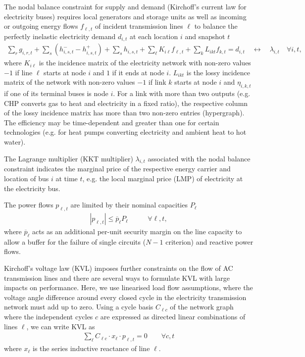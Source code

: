 The nodal balance constraint for supply and demand (Kirchoff's current law for electricity
buses) requires local generators and storage units as well as incoming or
outgoing energy flows $f_{\ell,t}$ of incident transmission lines $\ell$ to
balance the perfectly inelastic electricity demand $d_{i,t}$ at each location
$i$ and snapshot $t$
\begin{align}
    \sum_r g_{i,r,t} + \sum_s \left(h_{i,s,t}^- - h_{i,s,t}^+ \right) + \sum_s h_{i,s,t} + \sum_\ell K_{i\ell} f_{\ell,t} + \sum_k L_{ikt} f_{k,t} = d_{i,t}  \quad \leftrightarrow \quad \lambda_{i,t} \quad \forall i,t,
\end{align}
where $K_{i\ell}$ is the incidence matrix of the electricity network with
non-zero values $-1$ if line $\ell$ starts at node $i$ and $1$ if it ends at
node $i$. $L_{ikt}$ is the lossy incidence matrix of the network with
non-zero values $-1$ if link $k$ starts at node $i$ and $\eta_{i,k,t}$ if one of
its terminal buses is node $i$. For a link with more than two outputs (e.g. CHP
converts gas to heat and electricity in a fixed ratio), the respective column of
the lossy incidence matrix has more than two non-zero entries (hypergraph). The
efficiency may be time-dependent and greater than one for certain technologies
(e.g. for heat pumps converting electricity and ambient heat to hot water).

The Lagrange multiplier (KKT multiplier) $\lambda_{i,t}$ associated with the
nodal balance constraint indicates the marginal price of the respective energy
carrier and location of bus $i$ at time $t$, e.g. the local marginal price (LMP)
of electricity at the electricity bus.

The power flows $p_{\ell,t}$ are limited by their nominal capacities $P_\ell$
\begin{align}
	|p_{\ell,t}| \leq \overline{p}_{\ell} P_{\ell} & \qquad\forall \ell, t,
	\label{eq:cap}
\end{align}
where $\overline{p}_\ell$ acts as an additional per-unit security margin on the line capacity
to allow a buffer for the failure of single circuits ($N-1$ criterion) and reactive power flows.

Kirchoff's voltage law (KVL) imposes further constraints on the flow of AC
transmission lines and there are several ways to formulate KVL with large
impacts on performance. Here, we use linearised load flow assumptions, where the
voltage angle difference around every closed cycle in the electricity
transmission network must add up to zero. Using a cycle basis $C_{\ell c}$ of
the network graph where the independent cycles $c$ are expressed as directed
linear combinations of lines $\ell$, we can write
KVL as
\begin{align}
    \sum_\ell C_{\ell c} \cdot x_\ell \cdot p_{\ell,t} = 0 \qquad\forall c,t
    \label{eq:kvl}
\end{align}
where $x_\ell$ is the series inductive reactance of line $\ell$.

